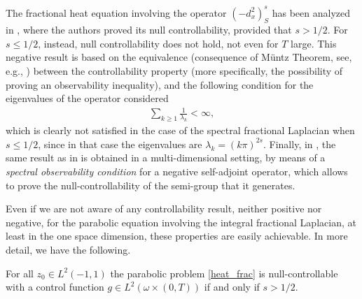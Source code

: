 The fractional heat equation involving the operator $(-d_x^2)^s_S$ has been analyzed in \cite{micu2006controllability}, where the authors proved its null controllability, provided that $s>1/2$. For $s\leq 1/2$, instead, null controllability does not hold, not even for $T$ large. This negative result is based on the equivalence (consequence of M\"untz Theorem, see, e.g., \cite[Page 24]{schwartz1958etude}) between the controllability property (more specifically, the possibility of proving an observability inequality), and the following condition for the eigenvalues of the operator considered
%
\begin{align}\label{eigen_cond}
	\sum_{k\geq 1} \frac{1}{\lambda_k}<\infty,
\end{align} 
%
which is clearly not satisfied in the case of the spectral fractional Laplacian when $s\leq 1/2$, since in that case the eigenvalues are $\lambda_k = (k\pi)^{2s}$. Finally, in \cite{miller2006controllability}, the same result as in \cite{micu2006controllability} is obtained in a multi-dimensional setting, by means of a  \textit{spectral observability condition} for a negative self-adjoint operator, which allows to prove the null-controllability of the semi-group that it generates.

Even if we are not aware of any controllability result, neither positive nor negative, for the parabolic equation involving the integral fractional Laplacian, at least in the one space dimension, these properties are easily achievable. In more detail, we have the following.

\begin{proposition}
For all $z_0\in L^2(-1,1)$ the parabolic problem \eqref{heat_frac} is null-controllable with a control function $g\in L^2(\omega\times(0,T))$ if and only if $s>1/2$.  
\end{proposition}

